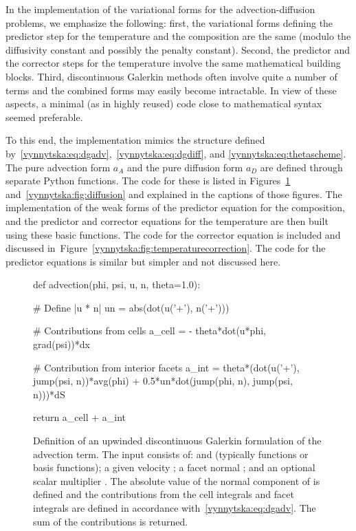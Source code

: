 In the implementation of the variational forms for the
advection-diffusion problems, we emphasize the following:
first, the variational forms defining the predictor step for
the temperature and the composition are the same (modulo the
diffusivity constant and possibly the penalty constant).  Second, the
predictor and the corrector steps for the temperature involve the same
mathematical building blocks. Third, discontinuous Galerkin methods
often involve quite a number of terms and the combined forms may
easily become intractable. In view of these aspects, a minimal (as in
highly reused) code close to mathematical syntax seemed preferable.

To this end, the implementation mimics the structure defined
by~\eqref{vynnytska:eq:dgadv},~\eqref{vynnytska:eq:dgdiff}, and
\eqref{vynnytska:eq:thetascheme}. The pure advection form $a_A$ and
the pure diffusion form $a_D$ are defined through separate Python
functions. The code for these is listed in
Figures~\ref{vynnytska:fig:advection}
and~\ref{vynnytska:fig:diffusion} and explained in the captions of
those figures. The implementation of the weak forms of the predictor
equation for the composition, and the predictor and corrector
equations for the temperature are then built using these basic functions. The
code for the corrector equation is included and discussed
in~Figure~\ref{vynnytska:fig:temperaturecorrection}. The code for the
predictor equations is similar but simpler and not discussed
here.
\begin{figure}
  \begin{center}
    \begin{python}
def advection(phi, psi, u, n, theta=1.0):

    # Define |u * n|
    un = abs(dot(u('+'), n('+')))

    # Contributions from cells
    a_cell = - theta*dot(u*phi, grad(psi))*dx

    # Contribution from interior facets
    a_int = theta*(dot(u('+'), jump(psi, n))*avg(phi)
                   + 0.5*un*dot(jump(phi, n), jump(psi, n)))*dS

    return a_cell + a_int
    \end{python}
    \caption{Definition of an upwinded discontinuous Galerkin
      formulation of the advection term. The input consists of:
       and  (typically functions or basis
      functions); a given velocity ; a facet normal ;
      and an optional scalar multiplier . The absolute
      value of the normal component of  is defined and the
      contributions from the cell integrals and facet integrals are
      defined in accordance with~\eqref{vynnytska:eq:dgadv}. The sum
      of the contributions is returned.}
    \label{vynnytska:fig:advection}
  \end{center}
\end{figure}
